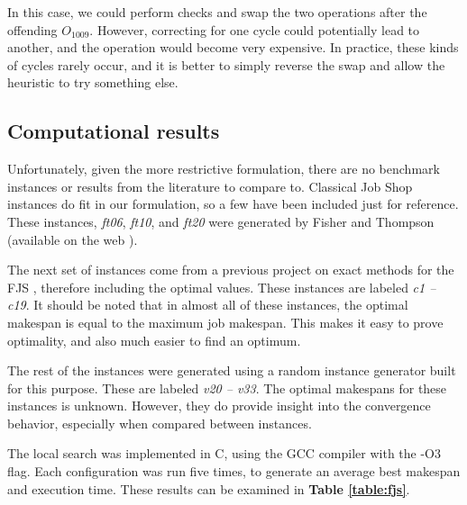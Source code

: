 \documentclass[a4paper,11pt]{article}
\begin{document}
In this case, we could perform checks and swap the two operations after the offending $O_{1009}$. However, correcting for one cycle could potentially lead to another, and the operation would become very expensive. In practice, these kinds of cycles rarely occur, and it is better to simply reverse the swap and allow the heuristic to try something else.

\subsection{Computational results}

Unfortunately, given the more restrictive formulation, there are no benchmark instances or results from the literature to compare to. Classical Job Shop instances do fit in our formulation, so a few have been included just for reference. These instances, \emph{ft06}, \emph{ft10}, and \emph{ft20} were generated by Fisher and Thompson (available on the web \cite{jobshopinfo}).

The next set of instances come from a previous project on exact methods for the FJS \cite{cijvat}, therefore including the optimal values. These instances are labeled \emph{c1 -- c19}. It should be noted that in almost all of these instances, the optimal makespan is equal to the maximum job makespan. This makes it easy to prove optimality, and also much easier to find an optimum.

The rest of the instances were generated using a random instance generator built for this purpose. These are labeled \emph{v20 -- v33}. The optimal makespans for these instances is unknown. However, they do provide insight into the convergence behavior, especially when compared between instances.

The local search was implemented in C, using the GCC compiler with the -O3 flag. Each configuration was run five times, to generate an average best makespan and execution time. These results can be examined in \textbf{Table \ref{table:fjs}}.
\end{document}

